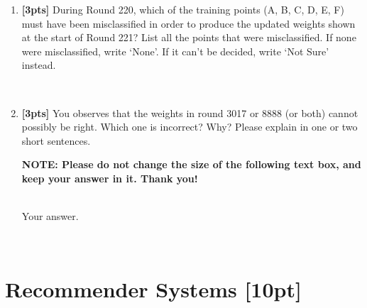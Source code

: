 \documentclass[11pt,addpoints,answers]{exam}
\renewcommand{\circle}{\tikz\draw[black] (0,0) circle (1ex);}
\begin{document}
\begin{enumerate}
\begin{enumerate}
    \item \textbf{[3pts]} During Round 220, which of the training points (A, B, C, D, E, F) must have been misclassified in order to produce the updated weights shown at the start of Round 221? List all the points that were misclassified.  If none were misclassified, write `None'. If it can't be decided, write `Not Sure' instead.

    \begin{tcolorbox}[fit,height=1cm, width=6cm, blank, borderline={1pt}{-2pt},nobeforeafter]
    \end{tcolorbox}\\

    \item \textbf{[3pts]}  You observes that the weights in round 3017 or 8888 (or both) cannot possibly be right. Which one is incorrect? Why? Please explain in one or two short sentences.


    \textbf{NOTE: Please do not change the size of the following text box, and keep your answer in it. Thank you!} \\ \\
    \begin{tcolorbox}[fit,height=4cm, width=15cm, blank, borderline={1pt}{-2pt},nobeforeafter]
    \large
    Your answer.

    \end{tcolorbox} \\
    
    
    

\end{enumerate}
    
\end{enumerate}\clearpage

\section{Recommender Systems [10pt]}
\end{document}
